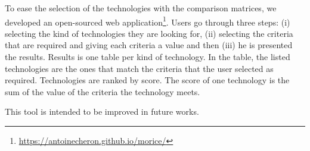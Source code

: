 To ease the selection of the technologies with the comparison matrices, we developed an open-sourced web application\footnote{\url{https://antoinecheron.github.io/morice/}}. Users go through three steps: (i) selecting the kind of technologies they are looking for, (ii) selecting the criteria that are required and giving each criteria a value and then (iii) he is presented the results. Results is one table per kind of technology. In the table, the listed technologies are the ones that match the criteria that the user selected as required. Technologies are ranked by score. The score of one technology is the sum of the value of the criteria the technology meets.

This tool is intended to be improved in future works.